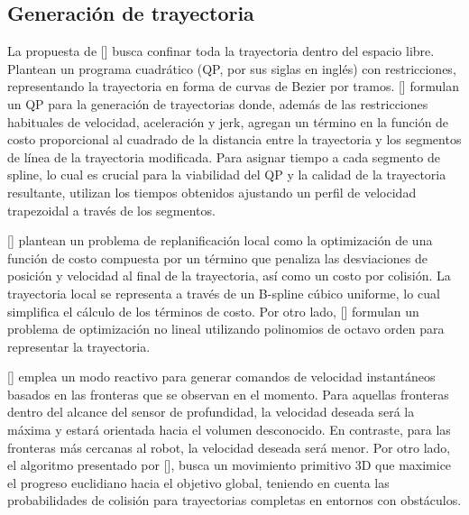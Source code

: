 

\subsection{Generación de trayectoria}

La propuesta de \citeauthor{GAO2018}[] busca confinar toda la trayectoria dentro del espacio libre. Plantean un programa cuadrático (QP, por sus siglas en inglés) con restricciones, representando la trayectoria en forma de curvas de Bezier por tramos. \citeauthor{MOHTA2017}[] formulan un QP para la generación de trayectorias donde, además de las restricciones habituales de velocidad, aceleración y jerk, agregan un término en la función de costo proporcional al cuadrado de la distancia entre la trayectoria y los segmentos de línea de la trayectoria modificada. Para asignar tiempo a cada segmento de spline, lo cual es crucial para la viabilidad del QP y la calidad de la trayectoria resultante, utilizan los tiempos obtenidos ajustando un perfil de velocidad trapezoidal a través de los segmentos.

\citeauthor{USENKO2017}[] plantean un problema de replanificación local como la optimización de una función de costo compuesta por un término que penaliza las desviaciones de posición y velocidad al final de la trayectoria, así como un costo por colisión. La trayectoria local se representa a través de un B-spline cúbico uniforme, lo cual simplifica el cálculo de los términos de costo. Por otro lado, \citeauthor{LIN2017}[] formulan un problema de optimización no lineal utilizando polinomios de octavo orden para representar la trayectoria.

\citeauthor{CIESLEWSKI2017}[] emplea un modo reactivo para generar comandos de velocidad instantáneos basados en las fronteras que se observan en el momento. Para aquellas fronteras dentro del alcance del sensor de profundidad, la velocidad deseada será la máxima y estará orientada hacia el volumen desconocido. En contraste, para las fronteras más cercanas al robot, la velocidad deseada será menor. Por otro lado, el algoritmo presentado por \citeauthor{FLORENCE2018}[], busca un movimiento primitivo 3D que maximice el progreso euclidiano hacia el objetivo global, teniendo en cuenta las probabilidades de colisión para trayectorias completas en entornos con obstáculos.

